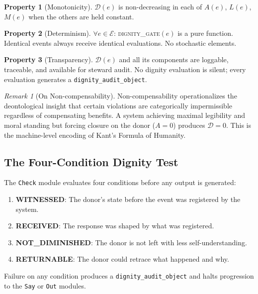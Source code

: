 \documentclass[12pt,a4paper]{article}
\theoremstyle{definition}
\newtheorem{property}{Property}[section]
\theoremstyle{remark}
\newtheorem{remark}{Remark}[section]
\newcommand{\dignitygate}{\textsc{dignity\_gate}}
\newcommand{\D}{\mathcal{D}}
\newcommand{\E}{\mathcal{E}}
\begin{document}
\begin{property}[Monotonicity]
$\D(e)$ is non-decreasing in each of $A(e)$, $L(e)$, $M(e)$ when the others are held
constant.
\end{property}

\begin{property}[Determinism]
$\forall e \in \E$: \dignitygate{}$(e)$ is a pure function. Identical events always
receive identical evaluations. No stochastic elements.
\end{property}

\begin{property}[Transparency]
$\D(e)$ and all its components are loggable, traceable, and available for steward
audit. No dignity evaluation is silent; every evaluation generates a
\texttt{dignity\_audit\_object}.
\end{property}

\begin{remark}[On Non-compensability]
Non-compensability operationalizes the deontological insight
\cite{belton2002,kant1785} that certain violations are categorically impermissible
regardless of compensating benefits. A system achieving maximal legibility and moral
standing but forcing closure on the donor ($A=0$) produces $\D=0$. This is the
machine-level encoding of Kant's Formula of Humanity.
\end{remark}

\subsection{The Four-Condition Dignity Test}

The \texttt{Check} module evaluates four conditions before any output is generated:

\begin{enumerate}
\item \textbf{WITNESSED}: The donor's state before the event was registered by the system.
\item \textbf{RECEIVED}: The response was shaped by what was registered.
\item \textbf{NOT\_DIMINISHED}: The donor is not left with less self-understanding.
\item \textbf{RETURNABLE}: The donor could retrace what happened and why.
\end{enumerate}

Failure on any condition produces a \texttt{dignity\_audit\_object} and halts
progression to the \texttt{Say} or \texttt{Out} modules.
\end{document}
